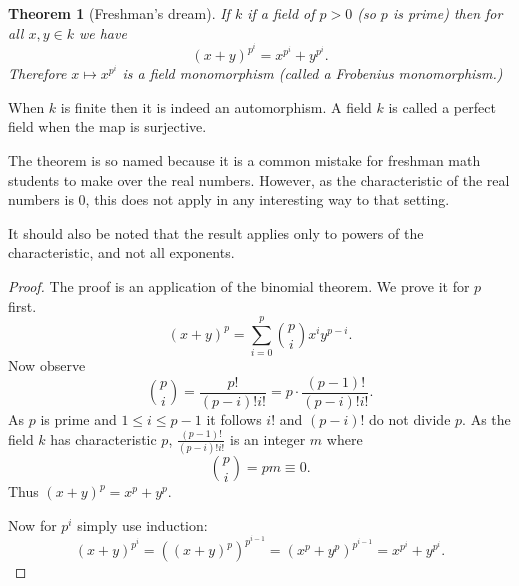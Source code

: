 \documentclass[12pt]{article}
\newtheorem{thm}{Theorem}
\begin{document}
\begin{thm}[Freshman's dream]
If $k$ if a field of  $p>0$ (so $p$ is prime) 
then for all $x,y\in k$ we have
\[(x+y)^{p^i}=x^{p^i}+y^{p^i}.\]
Therefore $x\mapsto x^{p^i}$ is a field monomorphism (called a Frobenius monomorphism.)  
\end{thm}

When $k$ is finite then it is indeed an automorphism.
A field $k$ is called a perfect field when the map is surjective.

The theorem is so named because it is a common mistake for freshman math students 
to make over the real numbers.  However, as the characteristic of the real numbers 
is 0, this does not apply in any interesting way to that setting. 

It should also be noted that the result applies only to powers of the characteristic, 
and not all exponents.


\begin{proof}
The proof is an application of the binomial theorem.  We prove it for $p$ first.
\[(x+y)^{p}=\sum_{i=0}^p \binom{p}{i} x^{i} y^{p-i}.\]
Now observe
\[\binom{p}{i}=\frac{p!}{(p-i)!i!}=p\!\cdot\!\frac{(p-1)!}{(p-i)! i!}.\]
As $p$ is prime and $1\leq i\leq p-1$ it follows $i!$ and $(p-i)!$ do not divide $p$.  
As the field $k$ has characteristic $p$, $\frac{(p-1)!}{(p-i)!i!}$ is an integer $m$ where
\[\binom{p}{i}=pm\equiv 0 .\]
Thus $(x+y)^p=x^p+y^p$.

Now for $p^i$ simply use induction:
\[(x+y)^{p^i}=((x+y)^p)^{p^{i-1}}=(x^p+y^p)^{p^{i-1}}
=x^{p^i}+y^{p^i}.\]
\end{proof}
\end{document}
